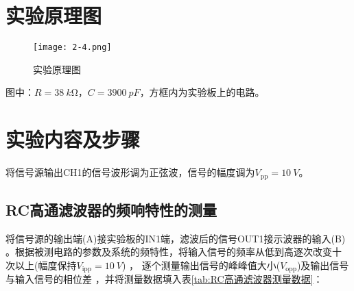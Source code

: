\section{实验原理图}%
\label{sec:实验原理图\arabic{chapter}}
\begin{figure}[htpb]
	\centering
	\texttt{[image: 2-4.png]}
	\caption{实验原理图}
	\label{fig:实验原理图\arabic{chapter}}
\end{figure}
图中：$ R=\SI{38}{k\ohm} $，$ C=\SI{3900}{pF} $，方框内为实验板上的电路。
\section{实验内容及步骤}%
\label{sec:实验内容及步骤\arabic{chapter}}
将信号源输出CH1的信号波形调为正弦波，信号的幅度调为$ V_\text{pp}=\SI{10}{V} $。
\subsection{RC高通滤波器的频响特性的测量}%
\label{sub:RC高通滤波器的频响特性的测量}
将信号源的输出端(A)接实验板的IN1端，滤波后的信号OUT1接示波器的输入(B) 。根据被测电路的参数及系统的频特性，将输入信号的频率从低到高逐次改变十 次以上(幅度保持$ V_\text{ipp}=\SI{10}{V} $) ， 逐个测量输出信号的峰峰值大小($ V_\text{opp} $)及输出信号与输入信号的相位差 ，并将测量数据填入表\ref{tab:RC高通滤波器测量数据}：

